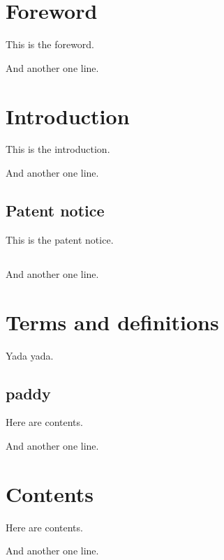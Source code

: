 \documentclass{Metanorma}
\begin{document}
  \section*{Foreword}

  This is the foreword.

  And another one line.

  \section*{Introduction}

  This is the introduction.

  And another one line.

  \subsection*{Patent notice}

  This is the patent notice.

  \subsection*{}

  And another one line.

  \section{Terms and definitions}

  Yada yada.

  \subsection{paddy}

  Here are contents.

  And another one line.

  \section{Contents}

  Here are contents.

  And another one line.
\end{document}
